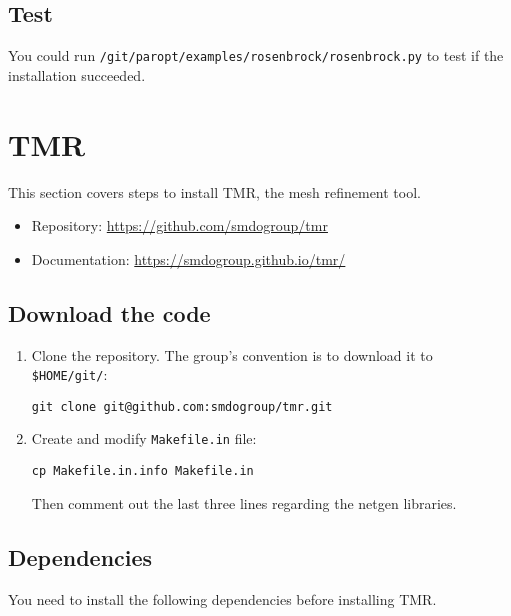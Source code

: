 \documentclass{article}
\begin{document}
\subsection{Test}

You could run \texttt{\texttildelow/git/paropt/examples/rosenbrock/rosenbrock.py} to test if the installation succeeded.

\section{TMR}

This section covers steps to install TMR, the mesh refinement tool.

\begin{itemize}
    \item Repository: \href{https://github.com/smdogroup/tmr}{https://github.com/smdogroup/tmr}
    \item Documentation: \href{https://smdogroup.github.io/tmr/}{https://smdogroup.github.io/tmr/}
\end{itemize}

\subsection{Download the code}

\begin{enumerate}
    \item
    Clone the repository. The group's convention is to download it to \texttt{\$HOME/git/}:

    \texttt{git clone git@github.com:smdogroup/tmr.git}

    \item
    Create and modify \texttt{Makefile.in} file:

    \texttt{cp Makefile.in.info Makefile.in}

    Then comment out the last three lines regarding the netgen libraries.

\end{enumerate}

\subsection{Dependencies}

You need to install the following dependencies before installing TMR.
\end{document}
